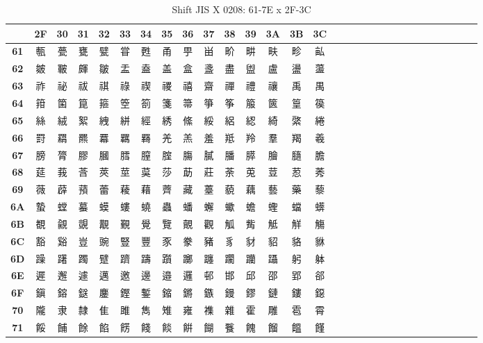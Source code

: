 \begin{table}[H]
\centering
\caption{Shift JIS X 0208: 61-7E x 2F-3C}
\begin{tabular}{|Sc|Sc|Sc|Sc|Sc|Sc|Sc|Sc|Sc|Sc|Sc|Sc|Sc|Sc|Sc|}
\hline
 & \textbf{2F} & \textbf{30} & \textbf{31} & \textbf{32} & \textbf{33} & \textbf{34} & \textbf{35} & \textbf{36} & \textbf{37} & \textbf{38} & \textbf{39} & \textbf{3A} & \textbf{3B} & \textbf{3C} \\ \hline
\textbf{61} & 甎 & 甍 & 甕 & 甓 & 甞 & 甦 & 甬 & 甼 & 畄 & 畍 & 畊 & 畉 & 畛 & 畆 \\ \hline
\textbf{62} & 皴 & 皸 & 皹 & 皺 & 盂 & 盍 & 盖 & 盒 & 盞 & 盡 & 盥 & 盧 & 盪 & 蘯 \\ \hline
\textbf{63} & 祚 & 祕 & 祓 & 祺 & 祿 & 禊 & 禝 & 禧 & 齋 & 禪 & 禮 & 禳 & 禹 & 禺 \\ \hline
\textbf{64} & 箝 & 箘 & 箟 & 箍 & 箜 & 箚 & 箋 & 箒 & 箏 & 筝 & 箙 & 篋 & 篁 & 篌 \\ \hline
\textbf{65} & 絲 & 絨 & 絮 & 絏 & 絣 & 經 & 綉 & 絛 & 綏 & 絽 & 綛 & 綺 & 綮 & 綣 \\ \hline
\textbf{66} & 罸 & 羂 & 羆 & 羃 & 羈 & 羇 & 羌 & 羔 & 羞 & 羝 & 羚 & 羣 & 羯 & 羲 \\ \hline
\textbf{67} & 膀 & 膂 & 膠 & 膕 & 膤 & 膣 & 腟 & 膓 & 膩 & 膰 & 膵 & 膾 & 膸 & 膽 \\ \hline
\textbf{68} & 莚 & 莪 & 莟 & 莢 & 莖 & 茣 & 莎 & 莇 & 莊 & 荼 & 莵 & 荳 & 荵 & 莠 \\ \hline
\textbf{69} & 薇 & 薜 & 蕷 & 蕾 & 薐 & 藉 & 薺 & 藏 & 薹 & 藐 & 藕 & 藝 & 藥 & 藜 \\ \hline
\textbf{6A} & 蟄 & 螳 & 蟇 & 蟆 & 螻 & 蟯 & 蟲 & 蟠 & 蠏 & 蠍 & 蟾 & 蟶 & 蟷 & 蠎 \\ \hline
\textbf{6B} & 覩 & 覦 & 覬 & 覯 & 覲 & 覺 & 覽 & 覿 & 觀 & 觚 & 觜 & 觝 & 觧 & 觴 \\ \hline
\textbf{6C} & 豁 & 谿 & 豈 & 豌 & 豎 & 豐 & 豕 & 豢 & 豬 & 豸 & 豺 & 貂 & 貉 & 貅 \\ \hline
\textbf{6D} & 躁 & 躇 & 躅 & 躄 & 躋 & 躊 & 躓 & 躑 & 躔 & 躙 & 躪 & 躡 & 躬 & 躰 \\ \hline
\textbf{6E} & 遲 & 邂 & 遽 & 邁 & 邀 & 邊 & 邉 & 邏 & 邨 & 邯 & 邱 & 邵 & 郢 & 郤 \\ \hline
\textbf{6F} & 鎭 & 鎔 & 鎹 & 鏖 & 鏗 & 鏨 & 鏥 & 鏘 & 鏃 & 鏝 & 鏐 & 鏈 & 鏤 & 鐚 \\ \hline
\textbf{70} & 隴 & 隶 & 隸 & 隹 & 雎 & 雋 & 雉 & 雍 & 襍 & 雜 & 霍 & 雕 & 雹 & 霄 \\ \hline
\textbf{71} & 餒 & 餔 & 餘 & 餡 & 餝 & 餞 & 餤 & 餠 & 餬 & 餮 & 餽 & 餾 & 饂 & 饉 \\ \hline

\end{tabular}
\end{table}
